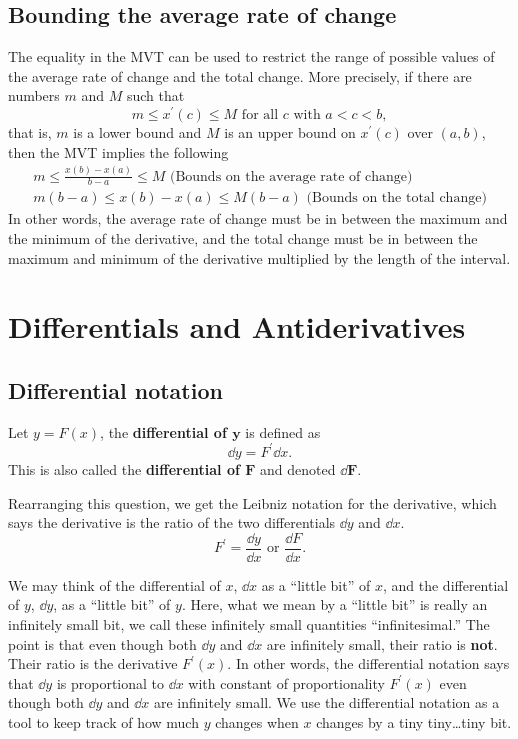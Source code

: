 \subsection{Bounding the average rate of change}
The equality in the MVT can be used to restrict the range of possible values of the average rate of change and the total change. More precisely, if there are numbers $m$ and $M$ such that
\[m\le x^\prime(c)\le M\text{ for all $c$ with }a<c<b,\]
that is, $m$ is a lower bound and $M$ is an upper bound on $x^\prime(c)$ over $(a,b)$, then the MVT implies the following
\begin{gather*}
m\le\frac{x(b)-x(a)}{b-a}\le M\text{ (Bounds on the average rate of change)}\\
m(b-a)\le x(b)-x(a)\le M(b-a)\text{ (Bounds on the total change)}
\end{gather*}
In other words, the average rate of change must be in between the maximum and the minimum of the derivative, and the total change must be in between the maximum and minimum of the derivative multiplied by the length of the interval.
\section{Differentials and Antiderivatives}
\subsection{Differential notation}
Let $y=F(x)$, the \textbf{differential of $\bm{y}$} is defined as
\[\dd y=F^\prime\dd x.\]
This is also called the \textbf{differential of $\bm{F}$} and denoted $\bm{\dd F}$.

\begin{note}
Rearranging this question, we get the Leibniz notation for the derivative, which says the derivative is the ratio of the two differentials $\dd y$ and $\dd x$.
\[F^\prime=\frac{\dd y}{\dd x}\text{ or }\frac{\dd F}{\dd x}.\]
\end{note}

We may think of the differential of $x$, $\dd x$ as a ``little bit'' of $x$, and the differential of $y$, $\dd y$, as a ``little bit'' of $y$. Here, what we mean by a ``little bit'' is really an infinitely small bit, we call these infinitely small quantities ``infinitesimal.'' The point is that even though both $\dd y$ and $\dd x$ are infinitely small, their ratio is \textbf{not}. Their ratio is the derivative $F^\prime(x)$. In other words, the differential notation says that $\dd y$ is proportional to $\dd x$ with constant of proportionality $F^\prime(x)$ even though both $\dd y$ and $\dd x$ are infinitely small. We use the differential notation as a tool to keep track of how much $y$ changes when $x$ changes by a tiny tiny\ldots tiny bit.

